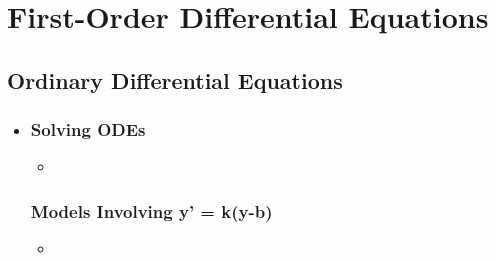 
\chapter{First-Order Differential Equations}

\section{Ordinary Differential Equations}
\begin{itemize}
  \item []

  \subsection{Solving ODEs}
  \begin{itemize}
    \item
  \end{itemize}

  \subsection{Models Involving y' = k(y-b)}
  \begin{itemize}
    \item
  \end{itemize}

\end{itemize}

